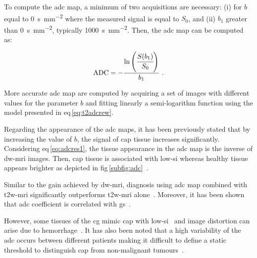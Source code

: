 To compute the \ac{adc} map, a minimum of two acquisitions are necessary: (i) for $b$ equal to \SI{0}{\second\per\milli\metre\squared} where the measured signal is equal to $S_0$, and (ii) $b_1$ greater than \SI{0}{\second\per\milli\metre\squared}, typically \SI{1000}{\second\per\milli\metre\squared}.
Then, the \ac{adc} map can be computed as:

\begin{equation}
	\text{ADC} = - \frac{\ln \left( \cfrac{S(b_1)}{S_0} \right) }{b_1} \ .
	\label{eq:adcres1}
\end{equation}

More accurate \ac{adc} map are computed by acquiring a set of images with different values for the parameter $b$ and fitting linearly a semi-logarithm function using the model presented in \acs{eq}\,\eqref{eq:t2adcrew}.

Regarding the appearance of the \ac{adc} maps, it has been previously stated that by increasing the value of $b$, the signal of \ac{cap} tissue increases significantly.
Considering \acs{eq}\,\eqref{eq:adcres1}, the tissue appearance in the \ac{adc} map is the inverse of \ac{dw}-\ac{mri} images.
Then, \ac{cap} tissue is associated with low-\ac{si} whereas healthy tissue appears brighter as depicted in \acs{fig}\,\ref{subfig:adc}~\cite{Barentsz2012}.

Similar to the gain achieved by \ac{dw}-\ac{mri}, diagnosis using \ac{adc} map combined with \ac{t2w}-\ac{mri} significantly outperforms \ac{t2w}-\ac{mri} alone~\cite{Doo2012,Choi2007}.
Moreover, it has been shown that \ac{adc} coefficient is correlated with \ac{gs}~\cite{Hambrock2011,Itou2011,Peng2013}.

However, some tissues of the \ac{cg} mimic \ac{cap} with low-\ac{si}~\cite{Kirkham2006} and image distortion can arise due to hemorrhage~\cite{Choi2007}.
It has also been noted that a high variability of the \ac{adc} occurs between different patients making it difficult to define a static threshold to distinguish \ac{cap} from non-malignant tumours~\cite{Choi2007}. 

